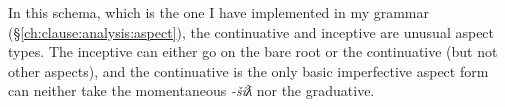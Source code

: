 \begin{comment}
\begin{tikzpicture}[sibling distance=10em,
  every node/.style = {shape=rectangle, align=center}]
\node (root) at (8,4.5) {Root};
\node (mo) at (2,2) {Momentaneous (8)};
\node (ct) at (8,2) {Continuative (13)};
\node (dr) at (10.5,2) {Durative (1)};
\node (rp) at (13,2) {Repetitive (6)};
\node (it) at (15,2) {Iterative (11)};
\node (in) at (4.5,2) {Inceptive (2)};
\node (mo-grad) at (2,0) {Moment.-Grad. (9)};
\node (in-grad) at (5,0) {Incept.-Grad. (3)};
\node (mo-grad-pf) at (2,-2) {Mom.-Grad.-Mom. (10)};
\node (in-grad-pf) at (5,-2) {Inc.-Grad.-Mom. (4)};
\node (dr-pf) at (7.5,-2) {Dur.-Mom. (14)};
\node (rp-pf) at (10,-2) {Repet.-Mom. (7)};
\node (it-pf) at (12.5,-2) {Iter.-Mom. (12)};
\node (it-pf2) at (15,-2) {Iter.-Mom. 2 (5)};
\draw[->] (root) -- (mo) node[midway,fill=white] {-šiƛ};
\draw[->] (root) -- (ct) node[midway,fill=white] {-(y)aˑ};
\draw[->] (root) -- (in) node[midway, fill=white] {-iˑčiƛ};
\draw[->] (root) -- (dr) node[midway,fill=white] {-uk};
\draw[->] (root) -- (rp) node[midway,fill=white] {-LR2L.a};
\draw[->] (root) -- (it) node[midway,fill=white, right] {-LR2L.š};
\draw[->] (mo) -- (mo-grad) node[near start,fill=lightgray] {-LS};
\draw[->] (in) -- (in-grad) node[near start,fill=lightgray] {-LS};
\draw[->] (mo-grad) -- (mo-grad-pf) node[near start,fill=white] {-šiƛ};
\draw[->] (in-grad) -- (in-grad-pf) node[near start,fill=white] {-šiƛ};
\draw[->] (ct) -- (in) node[midway,above right] {-iˑčiƛ};
\draw[->] (dr) -- (dr-pf) node[midway,fill=white] {-šiƛ};
\draw[->] (rp) -- (rp-pf) node[midway,fill=white] {-šiƛ};
\draw[->] (it) -- (it-pf) node[midway,fill=white] {-šiƛ};
\draw[->] (it) -- (it-pf2) node[midway,fill=white] {-iił};
\begin{scope}[on background layer]
\node[draw=none, fit=(ct)(dr)(it), fill=white] (impf) {};
\node[above left] at (impf.north east) {\textit{imperfective}};
\node[bigbox, fit=(mo)(in), fill=lightgray] (perf) {};
\node[below right] at (perf.north west) {\textit{perfective}};
\node[bigbox, fit=(mo-grad-pf)(it-pf)(it-pf2), fill=lightgray] (perf2) {};
\node[below right] at (perf2.north west) {\textit{perfective}};
\end{scope}
\end{tikzpicture}	
\end{comment}


In this schema, which is the one I have implemented in my grammar (\S\ref{ch:clause:analysis:aspect}), the continuative and inceptive are unusual aspect types. The inceptive can either go on the bare root or the continuative (but not other aspects), and the continuative is the only basic imperfective aspect form can neither take the momentaneous \textit{-šiƛ} nor the graduative.

